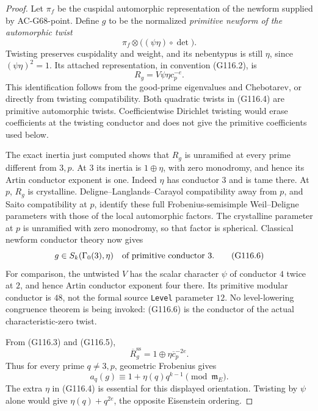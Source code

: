 \begin{proof}
Let \(\pi_f\) be the cuspidal automorphic representation of the
newform supplied by AC-G68-point.  Define \(g\) to be the
normalized \emph{primitive newform of the automorphic twist}
\[
                       \pi_f\otimes\bigl((\psi\eta)\circ\det\bigr).
 \tag{G116.4}
\]
Twisting preserves cuspidality and weight, and its nebentypus is
still \(\eta\), since \((\psi\eta)^2=1\).
Its attached representation, in convention (G116.2), is
\[
                      R_g=V\psi\eta c_p^{-e}.
 \tag{G116.5}
\]
This identification follows from the good-prime eigenvalues and
Chebotarev, or directly from twisting compatibility.
Both quadratic twists in (G116.4) are primitive automorphic
twists.  Coefficientwise Dirichlet twisting would erase
coefficients at the twisting conductor and does not give the
primitive coefficients used below.

The exact inertia just computed shows that \(R_g\) is unramified
at every prime different from \(3,p\).  At \(3\) its inertia
is \(1\oplus\eta\), with zero monodromy, and hence its Artin
conductor exponent is one.  Indeed \(\eta\) has conductor
\(3\) and is tame there.  At \(p\), \(R_g\) is crystalline.
Deligne--Langlands--Carayol compatibility away from \(p\),
and Saito compatibility at \(p\), identify these full
Frobenius-semisimple Weil--Deligne parameters with those of
the local automorphic factors.  The crystalline parameter at
\(p\) is unramified with zero monodromy, so that factor is
spherical.  Classical newform conductor theory now gives
\[
                    g\in S_k(\Gamma_0(3),\eta)
                 \quad\hbox{of primitive conductor }3.
 \tag{G116.6}
\]
For comparison, the untwisted \(V\) has the scalar character
\(\psi\) of conductor \(4\) twice at \(2\), and hence Artin
conductor exponent four there.  Its primitive modular conductor is \(48\), not
the formal source \texttt{Level} parameter \(12\).
No level-lowering congruence theorem is being invoked: (G116.6)
is the conductor of the actual characteristic-zero twist.

From (G116.3) and (G116.5),
\[
             \overline R_g^{\mathrm{ss}}
                    =1\oplus\eta\overline c_p^{-2e}.
 \tag{G116.7}
\]
Thus for every prime \(q\ne3,p\), geometric Frobenius gives
\[
                    a_q(g)\equiv1+\eta(q)q^{k-1}
                              \pmod{\mathfrak m_E}.
 \tag{G116.8}
\]
The extra \(\eta\) in (G116.4) is essential for this displayed
orientation.  Twisting by \(\psi\) alone would give
\(\eta(q)+q^{2e}\), the opposite Eisenstein ordering.


\end{proof}

